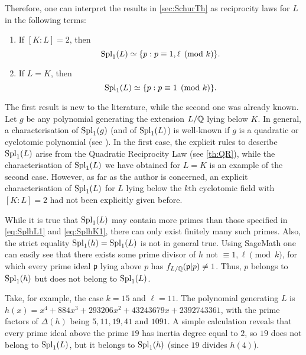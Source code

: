 \documentclass[../main.tex]{subfiles}
\begin{document}
Therefore, one can interpret the results in \cref{sec:SchurTh} as reciprocity laws for $L$ in the following terms:
\begin{enumerate}[label=(\alph*)]
	\item If $[K:L]=2$, then 
	\begin{equation}\label{eq:SplhL1}
	\operatorname{Spl}_1(L)\simeq\{p: p\equiv 1, \ell \pmod{k}\}.
	\end{equation}
	\item If $L=K$, then
	\begin{equation}\label{eq:SplhK1}
	\operatorname{Spl}_1(L)\simeq\{p: p\equiv 1 \pmod{k}\}.
	\end{equation}
\end{enumerate}
The first result is new to the literature, while the second one was already known. Let $g$ be any polynomial generating the extension $L/\mathbb{Q}$ lying below $K$. In general, a characterisation of $\operatorname{Spl}_1(g)$ (and of $\operatorname{Spl}_1(L)$) is well-known if $g$ is a quadratic or cyclotomic polynomial (see \cite{Chebotarev2}). In the first case, the explicit rules to describe $\operatorname{Spl}_1(L)$ arise from the Quadratic Reciprocity Law (see \cref{th:QR}), while the characterisation of $\operatorname{Spl}_1(L)$ we have obtained for $L=K$ is an example of the second case. However, as far as the author is concerned, an explicit characterisation of $\operatorname{Spl}_1(L)$ for $L$ lying below the $k$th cyclotomic field with $[K:L]=2$ had not been explicitly given before.

\begin{remarknonumber}
	While it is true that $\operatorname{Spl}_1(L)$ may contain more primes than those specified in \cref{eq:SplhL1} and \cref{eq:SplhK1}, there can only exist finitely many such primes. Also, the strict equality $\operatorname{Spl}_1(h)=\operatorname{Spl}_1(L)$ is not in general true. Using SageMath one can easily see that there exists some prime divisor of $h$ not $\equiv1,\ell\pmod{k}$, for which every prime ideal $\mathfrak{p}$ lying above $p$ has $f_{L/\mathbb{Q}}(\mathfrak{p}|p)\neq 1$. Thus, $p$ belongs to $\operatorname{Spl}_1(h)$ but does not belong to $\operatorname{Spl}_1(L)$. 

	Take, for example, the case $k=15$ and $\ell=11$. The polynomial generating $L$ is $h(x)=x^4+884x^3+293206x^2+43243679x+2392743361$, with the prime factors of $\Delta(h)$ being $5, 11, 19, 41$ and $1091$. A simple calculation reveals that every prime ideal above the prime $19$ has inertia degree equal to $2$, so $19$ does not belong to $\operatorname{Spl}_1(L)$, but it belongs to $\operatorname{Spl}_1(h)$ (since $19$ divides $h(4)$).
\end{remarknonumber}
\end{document}
